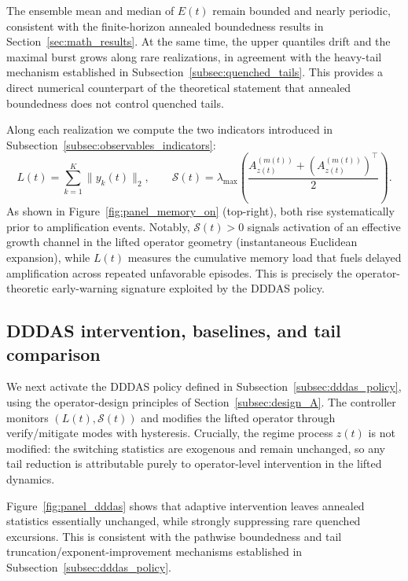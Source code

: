 \documentclass[12pt,a4paper]{article}
\theoremstyle{definition}
\theoremstyle{remark}
\begin{document}
The ensemble mean and median of $E(t)$ remain bounded and nearly periodic,
consistent with the finite-horizon annealed boundedness results in
Section~\ref{sec:math_results}. At the same time, the upper quantiles drift
and the maximal burst grows along rare realizations, in agreement with the
heavy-tail mechanism established in Subsection~\ref{subsec:quenched_tails}.
This provides a direct numerical counterpart of the theoretical statement that
annealed boundedness does not control quenched tails.

Along each realization we compute the two indicators introduced in
Subsection~\ref{subsec:observables_indicators}:
\[
L(t)=\sum_{k=1}^K \|y_k(t)\|_2,
\qquad
\mathcal{S}(t)=
\lambda_{\max}\!\left(
\frac{A_{z(t)}^{(m(t))}+(A_{z(t)}^{(m(t))})^\top}{2}
\right).
\]
As shown in Figure~\ref{fig:panel_memory_on} (top-right), both rise
systematically prior to amplification events. Notably, $\mathcal{S}(t)>0$
signals activation of an effective growth channel in the lifted operator
geometry (instantaneous Euclidean expansion), while $L(t)$ measures the
cumulative memory load that fuels delayed amplification across repeated
unfavorable episodes. This is precisely the operator-theoretic early-warning
signature exploited by the DDDAS policy.

\subsection{DDDAS intervention, baselines, and tail comparison}
\label{subsec:dddas_baselines_tail}

We next activate the DDDAS policy defined in
Subsection~\ref{subsec:dddas_policy}, using the operator-design principles of
Section~\ref{subsec:design_A}. The controller monitors $(L(t),\mathcal{S}(t))$
and modifies the lifted operator through verify/mitigate modes with hysteresis.
Crucially, the regime process $z(t)$ is not modified: the switching statistics
are exogenous and remain unchanged, so any tail reduction is attributable purely
to operator-level intervention in the lifted dynamics.

Figure~\ref{fig:panel_dddas} shows that adaptive intervention leaves annealed
statistics essentially unchanged, while strongly suppressing rare quenched
excursions. This is consistent with the pathwise boundedness and tail
truncation/exponent-improvement mechanisms established in
Subsection~\ref{subsec:dddas_policy}.
\end{document}
